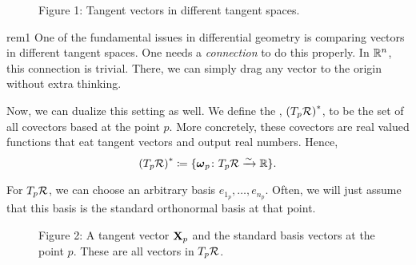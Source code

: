         \begin{figure}[ht]
        \centering
        \caption{Figure 1: Tangent vectors in different tangent spaces.}
        \end{figure}
        
\begin{remark}{}{rem1}
One of the fundamental issues in differential geometry is comparing vectors in different tangent spaces.  One needs a \emph{connection} to do this properly.  In $\mathbb{R}^n$, this connection is trivial.  There, we can simply drag any vector to the origin without extra thinking.
\end{remark}

Now, we can dualize this setting as well.  We define the , $\left(T_p\mathcal{R}\right)^*$, to be the set of all covectors based at the point $p$.  More concretely, these covectors are real valued functions that eat tangent vectors and output real numbers. Hence,
\[
\left(T_p\mathcal{R}\right)^* \coloneqq \{\boldsymbol{\omega}_p \colon T_p\mathcal{R} \xrightarrow{\sim} \mathbb{R}\}.
\]

For $T_p\mathcal{R}$, we can choose an arbitrary basis $e_{1_p},\dots, e_{n_p}$. Often, we will just assume that this basis is the standard orthonormal basis at that point.


\begin{figure}[ht]
\centering
    \caption{Figure 2: A tangent vector $\mathbf{X}_p$ and the standard basis vectors at the point $p$. These are all vectors in $T_p\mathcal{R}$.}
\end{figure}


